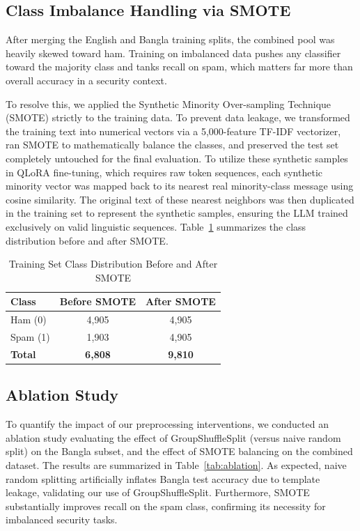 \documentclass[journal]{IEEEtran}
\begin{document}
\subsection{Class Imbalance Handling via SMOTE}

After merging the English and Bangla training splits, the combined pool was heavily skewed toward ham. Training on imbalanced data pushes any classifier toward the majority class and tanks recall on spam, which matters far more than overall accuracy in a security context.

To resolve this, we applied the Synthetic Minority Over-sampling Technique (SMOTE) strictly to the training data. To prevent data leakage, we transformed the training text into numerical vectors via a 5,000-feature TF-IDF vectorizer, ran SMOTE to mathematically balance the classes, and preserved the test set completely untouched for the final evaluation. To utilize these synthetic samples in QLoRA fine-tuning, which requires raw token sequences, each synthetic minority vector was mapped back to its nearest real minority-class message using cosine similarity. The original text of these nearest neighbors was then duplicated in the training set to represent the synthetic samples, ensuring the LLM trained exclusively on valid linguistic sequences. Table~\ref{tab:smote} summarizes the class distribution before and after SMOTE.

\begin{table}[htbp]
\caption{Training Set Class Distribution Before and After SMOTE}
\label{tab:smote}
\centering
\begin{tabular}{lcc}
\toprule
\textbf{Class} & \textbf{Before SMOTE} & \textbf{After SMOTE} \\
\midrule
Ham (0) & 4,905 & 4,905 \\
Spam (1) & 1,903 & 4,905 \\
\midrule
\textbf{Total} & \textbf{6,808} & \textbf{9,810} \\
\bottomrule
\end{tabular}
\end{table}

\subsection{Ablation Study}

To quantify the impact of our preprocessing interventions, we conducted an ablation study evaluating the effect of GroupShuffleSplit (versus naive random split) on the Bangla subset, and the effect of SMOTE balancing on the combined dataset. The results are summarized in Table~\ref{tab:ablation}. As expected, naive random splitting artificially inflates Bangla test accuracy due to template leakage, validating our use of GroupShuffleSplit. Furthermore, SMOTE substantially improves recall on the spam class, confirming its necessity for imbalanced security tasks.
\end{document}
